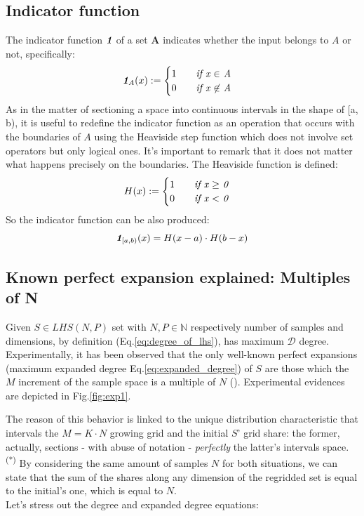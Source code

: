 \documentclass[12pt]{extarticle}
\newcommand{\meqref}[1]{Eq.\ref{#1}}
\newcommand{\mfigref}[1]{Fig.\ref{#1}}
\newcommand{\indfunc}[1]{\textit{\textbf{1}}_{#1}}
\begin{document}
\subsection{Indicator function}
\label{appendix:indicator_function}
The indicator function $\indfunc{}$ of a set \textbf{A} indicates whether the input belongs to $A$ or not, specifically:
\begin{equation}
\label{eq:indicator_function}
\indfunc{A}(x) := 
\begin{cases}
1 \qquad \text{\textit{if x $\in$ A}}\\
0 \qquad \text{\textit{if x $\not\in$ A}}
 \end{cases}
\end{equation}
As in the matter of sectioning a space into continuous intervals in the shape of [a, b), it is useful to redefine the indicator function as an operation that occurs with the boundaries of $A$ using the Heaviside step function which does not involve set operators but only logical ones. It's important to remark that it does not matter what happens precisely on the boundaries. 
The Heaviside function is defined:
\begin{equation}
\label{eq:heaviside}
H(x) := 
\begin{cases}
1 \qquad \text{\textit{if x $\geq$ 0}}\\
0 \qquad \text{\textit{if x $<$ 0}}
\end{cases}
\end{equation}
So the indicator function can be also produced:
\begin{equation}
\label{eq:indicator_function_with_h}
\indfunc{[a,b)}(x) = H(x - a) \cdot H(b - x)
\end{equation}

\subsection{Known perfect expansion explained: Multiples of N}
\label{appendix:N_multiples}
Given $S \in LHS(N, P)$ set with $N, P \in \mathbb{N}$ respectively number of samples and dimensions, by definition (\meqref{eq:degree_of_lhs}), has maximum $\mathcal{D}$ degree. Experimentally, it has been observed that the only well-known perfect expansions (maximum expanded degree \meqref{eq:expanded_degree}) of $S$ are those which the $M$ increment of the sample space is a multiple of $N$ (). Experimental evidences are depicted in \mfigref{fig:exp1}.

The reason of this behavior is linked to the unique distribution characteristic that intervals the $M = K \cdot N$ growing grid and the initial $S$' grid share: the former, actually, sections - with abuse of notation - \emph{perfectly} the latter's intervals space. \textsuperscript{(*)} By considering the same amount of samples $N$ for both situations, we can state that the sum of the shares along any dimension of the regridded set is equal to the initial's one, which is equal to $N$.\\
Let's stress out the degree and expanded degree equations:
\end{document}
